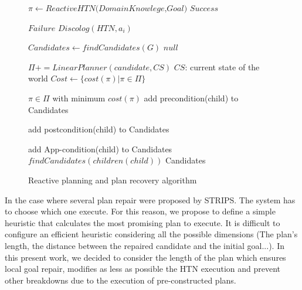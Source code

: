 \documentclass{llncs}
\begin{document}
			\begin{figure}[h]
			
				\begin{algorithmic}[]
					\State $\pi \gets Reactive HTN \textit{(DomainKnowlege,Goal)}$
					     \Return $\textit{Success} $
					\EndIf
					
					\Return $\textit{Failure} $
					\EndIf
					\State $\textit{Discolog} (HTN,a_i) $
					\EndFor
					
					\EndProcedure
					\State
					\State $ Candidates\gets\textit{findCandidates}{(G)} $
					\Return $null $
					\EndIf
					
					\State $\Pi +=  LinearPlanner(candidate, CS)   $
					\Comment $CS$: current state of the world
					\State  $Cost \gets \{ cost(\pi) | \pi \in  \Pi \} $
					\EndFor
					
					\State \Return $\pi \in \Pi$  with minimum $cost(\pi)$
					\EndProcedure
					\State
					add precondition(child) to Candidates
					
					add postcondition(child) to Candidates
					\EndIf
					
					add App-condition(child) to Candidates
					\EndIf
					\State $\textit{findCandidates} (children(child))$
					\EndFor
					\State\Return Candidates
					
					\EndProcedure 
					
				\end{algorithmic}
				\caption{ Reactive planning and plan recovery algorithm}
				\label{pseudoPSO}
			\end{figure} 	
		In the case where several plan repair were proposed by STRIPS. The system has to choose which one execute. For this reason, we propose to define a simple heuristic that calculates the most promising plan to execute. It is difficult to configure an efficient heuristic considering all the possible dimensions (The plan's length, the distance between the repaired candidate and the initial goal...). In this present work, we decided to consider the length of the plan which ensures local goal repair, modifies as less as possible the HTN execution and prevent other breakdowns due to the execution of pre-constructed plans. 
		
\end{document}
